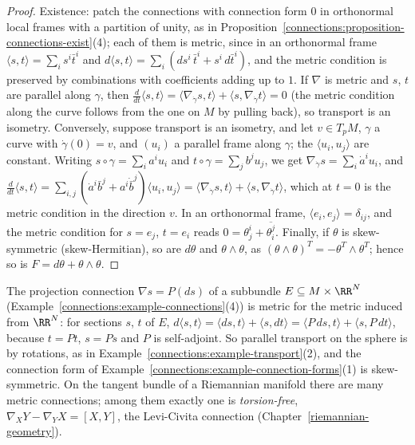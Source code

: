 \begin{proof}
Existence: patch the connections with connection form $0$ in orthonormal local frames with a partition of unity, as in Proposition~\ref{connections:proposition-connections-exist}(4); each of them is
metric, since in an orthonormal frame $\langle s, t\rangle = \sum_is^i\bar t^i$ and $d\langle s, t\rangle = \sum_i(ds^i\,\bar t^i + s^i\,d\bar t^i)$, and the metric condition is preserved by
combinations with coefficients adding up to $1$. If $\nabla$ is metric and $s$, $t$ are parallel along $\gamma$, then
$\frac{d}{dt}\langle s, t \rangle = \langle\nabla_{\dot\gamma}s, t\rangle + \langle s, \nabla_{\dot\gamma}t\rangle = 0$ (the metric condition along the curve follows from the one on $M$ by
pulling back), so transport is an isometry. Conversely, suppose transport is an isometry, and let $v \in T_pM$, $\gamma$ a curve with $\dot\gamma(0) = v$, and $(u_i)$ a parallel frame along $\gamma$; the
$\langle u_i, u_j\rangle$ are constant. Writing $s \circ \gamma = \sum_ia^iu_i$ and $t \circ \gamma = \sum_jb^ju_j$, we get $\nabla_{\dot\gamma}s = \sum_i\dot a^iu_i$, and
$\frac{d}{dt}\langle s, t\rangle = \sum_{i,j}(\dot a^i\bar b^j + a^i\dot{\bar b}^j)\langle u_i, u_j\rangle = \langle\nabla_{\dot\gamma}s, t\rangle + \langle s, \nabla_{\dot\gamma}t\rangle$, which at
$t = 0$ is the metric condition in the direction $v$. In an orthonormal frame, $\langle e_i, e_j\rangle = \delta_{ij}$, and the
metric condition for $s = e_j$, $t = e_i$ reads $0 = \theta^i_j + \overline{\theta^j_i}$. Finally, if $\theta$ is skew-symmetric (skew-Hermitian), so are $d\theta$ and
$\theta \wedge \theta$, as $(\theta \wedge \theta)^T = -\theta^T \wedge \theta^T$; hence so is $F = d\theta + \theta \wedge \theta$.
\end{proof}

\begin{example}\label{connections:example-metric-projection}
The projection connection $\nabla s = P(ds)$ of a subbundle $E \subseteq M \times \RR^N$ (Example~\ref{connections:example-connections}(4)) is metric for the metric induced from $\RR^N$:
for sections $s$, $t$ of $E$, $d\langle s, t\rangle = \langle ds, t\rangle + \langle s, dt\rangle = \langle P\,ds, t\rangle + \langle s, P\,dt\rangle$, because $t = Pt$, $s = Ps$ and $P$ is
self-adjoint. So parallel transport on the sphere is by rotations, as in Example~\ref{connections:example-transport}(2), and the connection form of
Example~\ref{connections:example-connection-forms}(1) is skew-symmetric. On the tangent bundle of a Riemannian manifold there are many metric connections; among them exactly one is
\emph{torsion-free}, $\nabla_XY - \nabla_YX = [X, Y]$, the Levi-Civita connection (Chapter~\ref{riemannian-geometry}).
\end{example}

